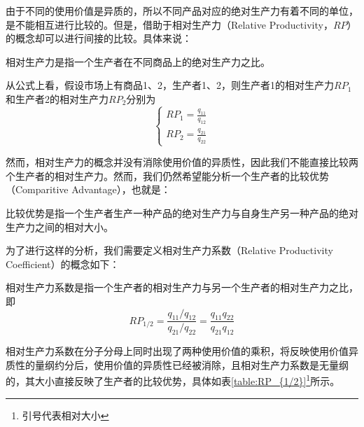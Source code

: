 由于不同的使用价值是异质的，所以不同产品对应的绝对生产力有着不同的单位，是不能相互进行比较的。但是，借助于相对生产力（Relative Productivity，$\mathit{RP}$）的概念却可以进行间接的比较。具体来说：

\begin{definition}
    相对生产力是指一个生产者在不同商品上的绝对生产力之比\cite[48]{CaiJiMingCongXiaYiJieZhiLunDaoGuangYiJieZhiLunXiuDingBan2022}。
\end{definition}

从公式上看，假设市场上有商品1、2，生产者1、2，则生产者1的相对生产力$\mathit{RP}_1$和生产者2的相对生产力$\mathit{RP}_2$分别为
\begin{equation}
    \begin{cases}
        \mathit{RP}_1=\frac{q_{11}}{q_{12}}\\
        \mathit{RP}_2=\frac{q_{21}}{q_{22}}
    \end{cases}
\end{equation}

然而，相对生产力的概念并没有消除使用价值的异质性，因此我们不能直接比较两个生产者的相对生产力。然而，我们仍然希望能分析一个生产者的比较优势（Comparitive Advantage），也就是：

\begin{definition}
    比较优势是指一个生产者生产一种产品的绝对生产力与自身生产另一种产品的绝对生产力之间的相对大小\cite[49]{CaiJiMingCongXiaYiJieZhiLunDaoGuangYiJieZhiLunXiuDingBan2022}。
\end{definition}

为了进行这样的分析，我们需要定义相对生产力系数（Relative Productivity Coefficient）的概念如下：

\begin{definition}
    相对生产力系数是指一个生产者的相对生产力与另一个生产者的相对生产力之比\cite[48]
    {CaiJiMingCongXiaYiJieZhiLunDaoGuangYiJieZhiLunXiuDingBan2022}，即
    \begin{equation}
        \mathit{RP}_{1/2} = \frac{q_{11}/q_{12}}{q_{21}/q_{22}} = \frac{q_{11}q_{22}}{q_{21}q_{12}}
    \end{equation}
\end{definition}

相对生产力系数在分子分母上同时出现了两种使用价值的乘积，将反映使用价值异质性的量纲约分后，使用价值的异质性已经被消除，且相对生产力系数是无量纲的，其大小直接反映了生产者的比较优势，具体如表\ref{table:RP_{1/2}}\footnote{引号代表相对大小}所示。

